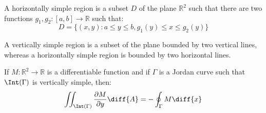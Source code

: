 \documentclass[crop=false,class=book,oneside]{standalone}
\begin{document}
            \begin{definition}
                A horizontally simple region is a subset $D$ of the plane
                $\mathbb{R}^{2}$ such that there are two functions
                $g_{1},g_{2}:[a,b]\rightarrow\mathbb{R}$ such that:
                \begin{equation}
                    D=\{(x,y):a\leq{y}\leq{b},g_{1}(y)\leq{x}\leq{g}_{2}(y)\}
                \end{equation}
            \end{definition}
            A vertically simple region is a subset of the plane bounded by
            two vertical lines, whereas a horizontally simple region is
            bounded by two horizontal lines.
            \begin{theorem}
                \label{thm:Diff_Theory_Greens_Theorem_Simple_t1_region}
                If $M:\mathbb{R}^{2}\rightarrow\mathbb{R}$ is a differentiable
                function and if $\Gamma$ is a Jordan curve such that
                $\Int(\Gamma)$ is vertically simple, then:
                \begin{equation}
                    \iint_{\Int(\Gamma)}
                        \frac{\partial{M}}{\partial{y}}\diff{A}
                    =-\oint_{\Gamma}M\diff{x}
                \end{equation}
            \end{theorem}
\end{document}
